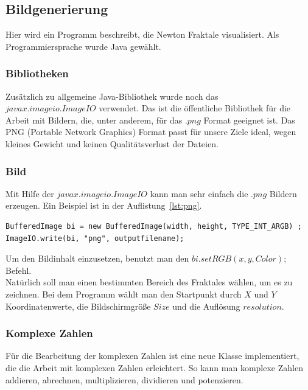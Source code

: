 \documentclass[a4paper,12pt]{llncs}
\numberwithin{equation}{section}
\begin{document}
\subsection{Bildgenerierung}\label{subs:vis:bild}
Hier wird ein Programm beschreibt, die Newton Fraktale visualisiert.
Als Programmiersprache wurde Java gewählt.

\subsubsection{Bibliotheken}
Zusätzlich zu allgemeine Java-Bibliothek wurde noch das\\ $javax$.$imageio$.$ImageIO$ verwendet.
Das ist die öffentliche Bibliothek für die Arbeit mit Bildern, die, unter anderem, für das .$png$ Format geeignet ist.
Das PNG (Portable Network Graphics) Format passt für unsere Ziele ideal, wegen kleines Gewicht und keinen Qualitätsverlust der Dateien.

\subsubsection{Bild}
Mit Hilfe der $javax$.$imageio$.$ImageIO$ kann man sehr einfach die .$png$ Bildern erzeugen. 
Ein Beispiel ist in der Auflistung~\ref{lst:png}.
\begin{lstlisting}[float,caption=Ein Beispiel für die PNG Generierung, label=lst:png,captionpos=b]
BufferedImage bi = new BufferedImage(width, height, TYPE_INT_ARGB) ;
ImageIO.write(bi, "png", outputfilename);
\end{lstlisting}
Um den Bildinhalt einzusetzen, benutzt man den $bi.setRGB(x, y, Color);$ Befehl.\\
Natürlich soll man einen bestimmten Bereich des Fraktales wählen, um es zu zeichnen. 
Bei dem Programm wählt man den Startpunkt durch $X$ und $Y$ Koordinatenwerte, die Bildschirmgröße $Size$ und die Auflösung $resolution$. 

\subsubsection{Komplexe Zahlen}
Für die Bearbeitung der komplexen Zahlen ist eine neue Klasse implementiert, die die Arbeit mit komplexen Zahlen erleichtert. 
So kann man komplexe Zahlen addieren, abrechnen, multiplizieren, dividieren und potenzieren.
\end{document}
